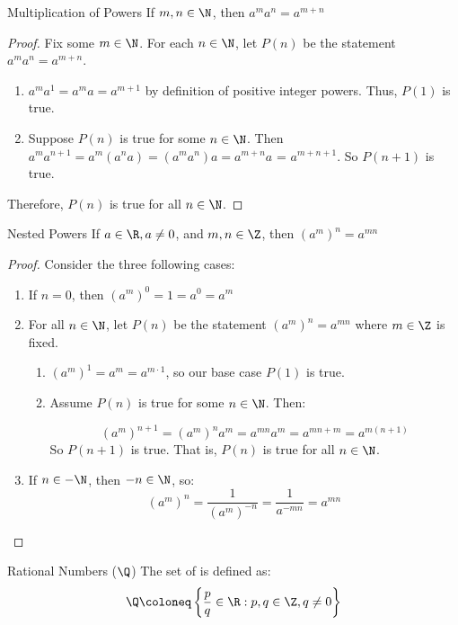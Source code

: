 \documentclass[letterpaper,12pt]{report}
\begin{document}
\begin{exbox}{Multiplication of Powers}{}
	If $m, n \in \N$, then $a^ma^n = a^{m+n}$
	\tcblower
	\begin{proof}
		Fix some $m \in \N$. For each $n \in \N$, let $P(n)$ be the statement $a^ma^n = a^{m+n}$.
		\begin{enumerate}
			\item $a^ma^1 = a^m a = a^{m+1}$ by definition of positive integer powers. Thus, $P(1)$ is true.
			\item Suppose $P(n)$ is true for some $n \in \N$. Then $a^m a^{n+1} = a^m(a^na) = (a^ma^n)a = a^{m+n}a$ = $a^{m+n+1}$. So $P(n+1)$ is true.
		\end{enumerate}
		Therefore, $P(n)$ is true for all $n \in \N$.
	\end{proof}
\end{exbox}

\begin{exbox}{Nested Powers}{}
	If $a \in \R, a \neq 0$, and $m,n \in \Z$, then $(a^m)^n = a^{mn}$
	\tcblower
	\begin{proof} Consider the three following cases:
		\begin{enumerate}
			\item If $n=0$, then $(a^m)^0 = 1 = a^0 = a^m$
			\item For all $n \in \N$, let $P(n)$ be the statement $(a^m)^n = a^{mn}$ where $m \in \Z$ is fixed.
			\begin{enumerate}
				\item $(a^m)^1 = a^m = a^{m \cdot 1}$, so our base case $P(1)$ is true.
				\item Assume $P(n)$ is true for some $n \in \N$. Then:

				$$(a^m)^{n+1} = (a^m)^n a^m = a^{mn}a^m = a^{mn+m} = a^{m(n+1)}$$
				So $P(n+1)$ is true. That is, $P(n)$ is true for all $n \in \N$.
			\end{enumerate}
			\item If $n \in -\N$, then $-n \in \N$, so:
			$$(a^m)^n = \frac{1}{(a^m)^{-n}} = \frac{1}{a^{-mn}} = a^{mn}$$
		\end{enumerate}
	\end{proof}
\end{exbox}

\begin{dfnbox}{Rational Numbers ($\Q$)}{}
	The set of  is defined as:
	\[ \Q \coloneq \left\{ \frac{p}{q} \in \R : p, q \in \Z, q \neq 0 \right\} \]
\end{dfnbox}
\end{document}
